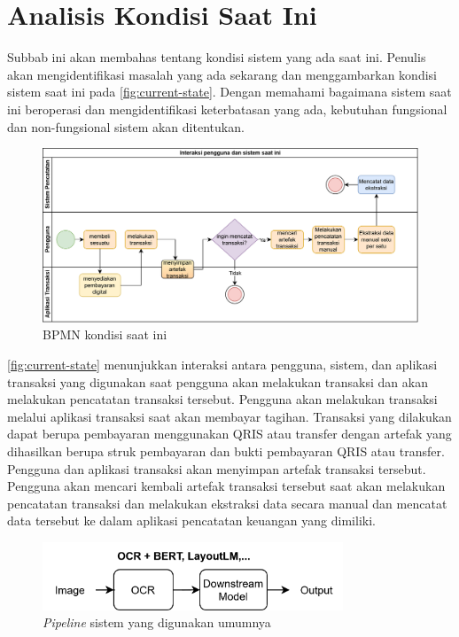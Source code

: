 \section{Analisis Kondisi Saat Ini}
\label{sec:analisis-kondisi-saat-ini}

Subbab ini akan membahas tentang kondisi sistem yang ada saat ini. Penulis akan mengidentifikasi masalah yang ada sekarang dan menggambarkan kondisi sistem saat ini pada \autoref{fig:current-state}. Dengan memahami bagaimana sistem saat ini beroperasi dan mengidentifikasi keterbatasan yang ada, kebutuhan fungsional dan non-fungsional sistem akan ditentukan.

\begin{figure}[htbp]
    \centering
    \includegraphics[width=1\textwidth]{images/current-state.png}
    \caption{BPMN kondisi saat ini}
    \label{fig:current-state}
\end{figure}

\autoref{fig:current-state} menunjukkan interaksi antara pengguna, sistem, dan aplikasi transaksi yang digunakan saat pengguna akan melakukan transaksi dan akan melakukan pencatatan transaksi tersebut. Pengguna akan melakukan transaksi melalui aplikasi transaksi saat akan membayar tagihan. Transaksi yang dilakukan dapat berupa pembayaran menggunakan QRIS atau transfer dengan artefak yang dihasilkan berupa struk pembayaran dan bukti pembayaran QRIS atau transfer. Pengguna dan aplikasi transaksi akan menyimpan artefak transaksi tersebut. Pengguna akan mencari kembali artefak transaksi tersebut saat akan melakukan pencatatan transaksi dan melakukan ekstraksi data secara manual dan mencatat data tersebut ke dalam aplikasi pencatatan keuangan yang dimiliki.

\begin{figure}[htbp]
    \centering
    \includegraphics[width=0.8\textwidth]{images/non-donut-pipeline.png}
    \caption{\emph{Pipeline} sistem yang digunakan umumnya}
    \label{fig:non-donut-pipeline}
\end{figure}

